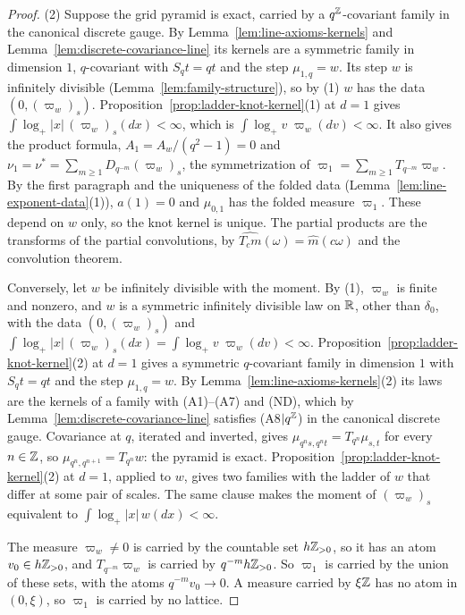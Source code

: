 \begin{proof}
(2) Suppose the grid pyramid is exact, carried by a $q^{\mathbb{Z}}$-covariant family in the
canonical discrete gauge. By Lemma~\ref{lem:line-axioms-kernels} and
Lemma~\ref{lem:discrete-covariance-line} its kernels are a symmetric family in dimension $1$,
$q$-covariant with $S_qt = qt$ and the step $\mu_{1,q} = w$. Its step $w$ is infinitely divisible
(Lemma~\ref{lem:family-structure}), so by (1) $w$ has the data $(0, (\varpi_w)_s)$.
Proposition~\ref{prop:ladder-knot-kernel}(1) at $d = 1$ gives
$\int\log_+|x|\,(\varpi_w)_s(dx) < \infty$, which is $\int\log_+v\;\varpi_w(dv) < \infty$. It
also gives the product formula, $A_1 = A_w/(q^2 - 1) = 0$ and
$\nu_1 = \nu^* = \sum_{m \ge 1}D_{q^{-m}}(\varpi_w)_s$, the symmetrization of
$\varpi_1 = \sum_{m \ge 1}T_{q^{-m}}\varpi_w$. By the first paragraph and the uniqueness of the
folded data (Lemma~\ref{lem:line-exponent-data}(1)), $a(1) = 0$ and $\mu_{0,1}$ has the folded
measure $\varpi_1$. These depend on $w$ only, so the knot kernel is unique. The partial products
are the transforms of the partial convolutions, by $\widehat{T_c m}(\omega) = \widehat m(c\omega)$
and the convolution theorem.

Conversely, let $w$ be infinitely divisible with the moment. By (1), $\varpi_w$ is finite and
nonzero, and $w$ is a symmetric infinitely divisible law on $\mathbb{R}$, other than $\delta_0$, with the
data $(0, (\varpi_w)_s)$ and $\int\log_+|x|\,(\varpi_w)_s(dx) = \int\log_+v\;\varpi_w(dv) < \infty$.
Proposition~\ref{prop:ladder-knot-kernel}(2) at $d = 1$ gives a symmetric $q$-covariant family in
dimension $1$ with $S_qt = qt$ and the step $\mu_{1,q} = w$. By
Lemma~\ref{lem:line-axioms-kernels}(2) its laws are the kernels of a family with (A1)--(A7) and
(ND), which by Lemma~\ref{lem:discrete-covariance-line} satisfies (A8$|q^{\mathbb{Z}}$) in the canonical
discrete gauge. Covariance at $q$, iterated and inverted, gives
$\mu_{q^ns,q^nt} = T_{q^n}\mu_{s,t}$ for every $n \in \mathbb{Z}$, so
$\mu_{q^n,q^{n+1}} = T_{q^n}w$: the pyramid is exact. Proposition~\ref{prop:ladder-knot-kernel}(2)
at $d = 1$, applied to $w$, gives two families with the ladder of $w$ that differ at some pair
of scales. The same clause makes the moment of $(\varpi_w)_s$ equivalent to
$\int\log_+|x|\,w(dx) < \infty$.

The measure $\varpi_w \ne 0$ is carried by the countable set $h\mathbb{Z}_{>0}$, so it has an atom
$v_0 \in h\mathbb{Z}_{>0}$, and $T_{q^{-m}}\varpi_w$ is carried by $q^{-m}h\mathbb{Z}_{>0}$. So $\varpi_1$ is
carried by the union of these sets, with the atoms $q^{-m}v_0 \to 0$. A measure carried by $\xi\mathbb{Z}$
has no atom in $(0, \xi)$, so $\varpi_1$ is carried by no lattice.


\end{proof}
